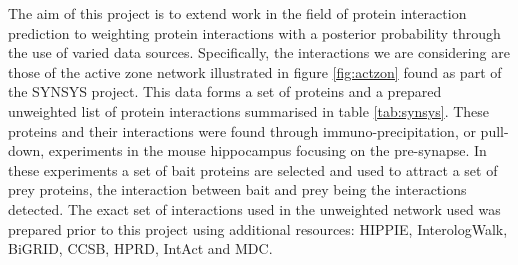 The aim of this project is to extend work in the field of protein interaction prediction \autocites{qi_evaluation_2006,mcdowall_pips:_2009,rodgers-melnick_predicting_2013,von_mering_string:2005} to weighting protein interactions with a posterior probability through the use of varied data sources.
Specifically, the interactions we are considering are those of the active zone network illustrated in figure \ref{fig:actzon} found as part of the SYNSYS project\autocite{synsys}.
This data forms a set of proteins and a prepared unweighted list of protein interactions summarised in table \ref{tab:synsys}.
These proteins and their interactions were found through immuno-precipitation, or pull-down, experiments in the mouse hippocampus focusing on the pre-synapse.
In these experiments a set of bait proteins are selected and used to attract a set of prey proteins, the interaction between bait and prey being the interactions detected.
The exact set of interactions used in the unweighted network used was prepared prior to this project using additional resources: HIPPIE\autocite{schaefer_hippie:_2012}, InterologWalk\autocite{gallone_bio::homology::interologwalk_2011}, BiGRID\autocite{stark_biogrid:_2006}, CCSB\autocite{yu_high-quality_2008}, HPRD\autocite{baolin_hprd:_2007}, IntAct\autocite{hermjakob_intact:_2004} and MDC\autocite{futschik_comparison_2006}.

